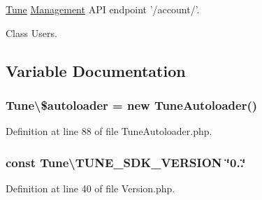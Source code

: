 \hyperlink{namespaceTune}{Tune} \hyperlink{namespaceTune_1_1Management}{Management} A\-P\-I endpoint '/account/'.

Class Users.

\subsection{Variable Documentation}
\hypertarget{namespaceTune_a45833c84db9823c05fccd9d72c991286}{
\subsubsection[{\$autoloader}]{\setlength{\rightskip}{0pt plus 5cm}Tune\textbackslash{}\$autoloader = new {\bf Tune\-Autoloader}()}}\label{namespaceTune_a45833c84db9823c05fccd9d72c991286}


Definition at line 88 of file Tune\-Autoloader.\-php.

\hypertarget{namespaceTune_a064a74b8093f320885e1a817c501a0cc}{
\subsubsection[{T\-U\-N\-E\-\_\-\-S\-D\-K\-\_\-\-V\-E\-R\-S\-I\-O\-N}]{\setlength{\rightskip}{0pt plus 5cm}const Tune\textbackslash{}\-T\-U\-N\-E\-\_\-\-S\-D\-K\-\_\-\-V\-E\-R\-S\-I\-O\-N \char`\"{}0..\char`\"{}}}\label{namespaceTune_a064a74b8093f320885e1a817c501a0cc}


Definition at line 40 of file Version.\-php.

